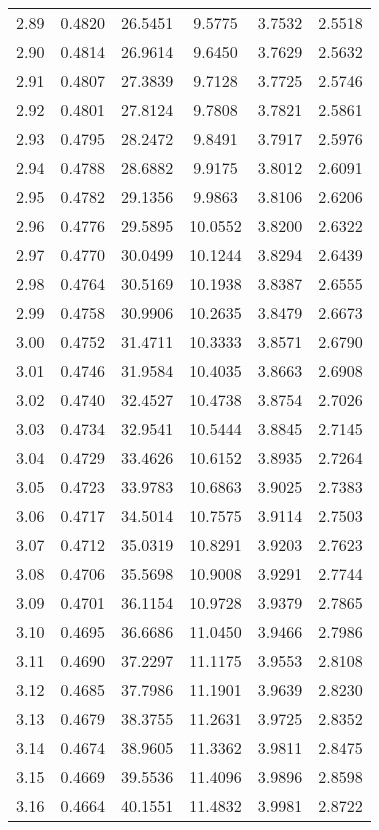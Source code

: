 \documentclass{article}
\begin{document}
\begin{longtable}{cccccc}
2.89 & 0.4820 & 26.5451 & 9.5775 & 3.7532 & 2.5518 \\
2.90 & 0.4814 & 26.9614 & 9.6450 & 3.7629 & 2.5632 \\
2.91 & 0.4807 & 27.3839 & 9.7128 & 3.7725 & 2.5746 \\
2.92 & 0.4801 & 27.8124 & 9.7808 & 3.7821 & 2.5861 \\
2.93 & 0.4795 & 28.2472 & 9.8491 & 3.7917 & 2.5976 \\
2.94 & 0.4788 & 28.6882 & 9.9175 & 3.8012 & 2.6091 \\
2.95 & 0.4782 & 29.1356 & 9.9863 & 3.8106 & 2.6206 \\
2.96 & 0.4776 & 29.5895 & 10.0552 & 3.8200 & 2.6322 \\
2.97 & 0.4770 & 30.0499 & 10.1244 & 3.8294 & 2.6439 \\
2.98 & 0.4764 & 30.5169 & 10.1938 & 3.8387 & 2.6555 \\
2.99 & 0.4758 & 30.9906 & 10.2635 & 3.8479 & 2.6673 \\
3.00 & 0.4752 & 31.4711 & 10.3333 & 3.8571 & 2.6790 \\
3.01 & 0.4746 & 31.9584 & 10.4035 & 3.8663 & 2.6908 \\
3.02 & 0.4740 & 32.4527 & 10.4738 & 3.8754 & 2.7026 \\
3.03 & 0.4734 & 32.9541 & 10.5444 & 3.8845 & 2.7145 \\
3.04 & 0.4729 & 33.4626 & 10.6152 & 3.8935 & 2.7264 \\
3.05 & 0.4723 & 33.9783 & 10.6863 & 3.9025 & 2.7383 \\
3.06 & 0.4717 & 34.5014 & 10.7575 & 3.9114 & 2.7503 \\
3.07 & 0.4712 & 35.0319 & 10.8291 & 3.9203 & 2.7623 \\
3.08 & 0.4706 & 35.5698 & 10.9008 & 3.9291 & 2.7744 \\
3.09 & 0.4701 & 36.1154 & 10.9728 & 3.9379 & 2.7865 \\
3.10 & 0.4695 & 36.6686 & 11.0450 & 3.9466 & 2.7986 \\
3.11 & 0.4690 & 37.2297 & 11.1175 & 3.9553 & 2.8108 \\
3.12 & 0.4685 & 37.7986 & 11.1901 & 3.9639 & 2.8230 \\
3.13 & 0.4679 & 38.3755 & 11.2631 & 3.9725 & 2.8352 \\
3.14 & 0.4674 & 38.9605 & 11.3362 & 3.9811 & 2.8475 \\
3.15 & 0.4669 & 39.5536 & 11.4096 & 3.9896 & 2.8598 \\
3.16 & 0.4664 & 40.1551 & 11.4832 & 3.9981 & 2.8722 \\

\end{longtable}
\end{document}

